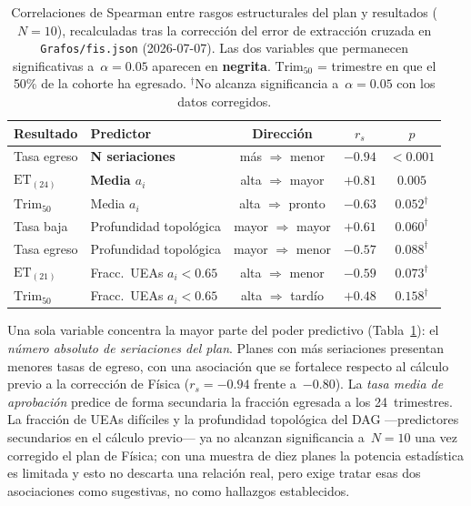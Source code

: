 \documentclass[11pt,letterpaper]{article}
\newcommand{\ET}[1]{\mathrm{ET}_{(#1)}}
\begin{document}
\begin{table}[H]\centering
\caption{Correlaciones de Spearman entre rasgos estructurales del plan y resultados
  ($N=10$), recalculadas tras la corrección del error de extracción cruzada en
  \texttt{Grafos/fis.json} (2026-07-07).
  Las dos variables que permanecen significativas a~$\alpha=0.05$ aparecen en
  \textbf{negrita}.
  $\mathrm{Trim}_{50}$ = trimestre en que el 50\% de la cohorte ha egresado.
  $^{\dagger}$No alcanza significancia a~$\alpha=0.05$ con los datos corregidos.}
\label{tab:corr_plan}
\small
\begin{tabular}{llccc}
\toprule
Resultado & Predictor & Dirección & $r_s$ & $p$ \\
\midrule
Tasa egreso & \textbf{N seriaciones} & más $\Rightarrow$ menor & $-0.94$ & $<0.001$ \\
$\ET{24}$ & \textbf{Media $a_i$} & alta $\Rightarrow$ mayor & $+0.81$ & $0.005$ \\
$\mathrm{Trim}_{50}$ & Media $a_i$ & alta $\Rightarrow$ pronto & $-0.63$ & $0.052^{\dagger}$ \\
Tasa baja & Profundidad topológica & mayor $\Rightarrow$ mayor & $+0.61$ & $0.060^{\dagger}$ \\
Tasa egreso & Profundidad topológica & mayor $\Rightarrow$ menor & $-0.57$ & $0.088^{\dagger}$ \\
$\ET{21}$ & Fracc.\ UEAs $a_i<0.65$ & alta $\Rightarrow$ menor & $-0.59$ & $0.073^{\dagger}$ \\
$\mathrm{Trim}_{50}$ & Fracc.\ UEAs $a_i<0.65$ & alta $\Rightarrow$ tardío & $+0.48$ & $0.158^{\dagger}$ \\
\bottomrule
\end{tabular}
\end{table}

Una sola variable concentra la mayor parte del poder predictivo
(Tabla~\ref{tab:corr_plan}): el \emph{número absoluto de seriaciones del plan}.
Planes con más seriaciones presentan menores tasas de egreso, con una
asociación que se fortalece respecto al cálculo previo a la corrección de
Física ($r_s=-0.94$ frente a~$-0.80$).
La \emph{tasa media de aprobación} predice de forma secundaria la fracción
egresada a los 24~trimestres.
La fracción de UEAs difíciles y la profundidad topológica del DAG
---predictores secundarios en el cálculo previo--- ya no alcanzan
significancia a~$N=10$ una vez corregido el plan de Física; con una muestra
de diez planes la potencia estadística es limitada y esto no descarta una
relación real, pero exige tratar esas dos asociaciones como sugestivas, no
como hallazgos establecidos.
\end{document}
